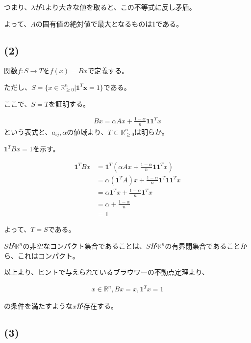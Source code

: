 \documentclass[a4paper, 10pt, dvipdfmx]{jlreq}
\begin{document}
つまり、$\lambda$が1より大きな値を取ると、この不等式に反し矛盾。

よって、$A$の固有値の絶対値で最大となるものは1である。

\subsection*{(2)}

関数$f:S \to T$を$f(x)=Bx$で定義する。

ただし、$S=\{x\in \mathbb{R}_{\geq 0}^n | \bm{1}^T\bm{x}=1 \}$である。

ここで、$S=T$を証明する。

\begin{align*}
  Bx=\alpha Ax+\frac{1-\alpha}{n}\bm{1}\bm{1}^Tx
\end{align*}
という表式と、$a_{ij},\alpha$の値域より、$T \subset \mathbb{R}_{\geq 0}^n$は明らか。

$\bm{1}^TBx=1$を示す。

\begin{align*}
  \bm{1}^TBx & =\bm{1}^T\left(\alpha Ax+\frac{1-\alpha}{n}\bm{1}\bm{1}^Tx\right) \\
             & =\alpha (\bm{1}^TA)x+\frac{1-\alpha}{n}\bm{1}^T\bm{1}\bm{1}^Tx    \\
             & =\alpha \bm{1}^Tx+\frac{1-\alpha}{n}\bm{1}^Tx                     \\
             & =\alpha+\frac{1-\alpha}{n}                                        \\
             & =1
\end{align*}

よって、$T=S$である。

$S$が$\mathbb{R}^n$の非空なコンパクト集合であることは、$S$が$\mathbb{R}^n$の有界閉集合であることから、これはコンパクト。

以上より、ヒントで与えられているブラウワーの不動点定理より、

\begin{align*}
  x\in \mathbb{R}^n,
  Bx=x, \bm{1}^Tx=1
\end{align*}

の条件を満たすような$x$が存在する。

\subsection*{(3)}
\end{document}
